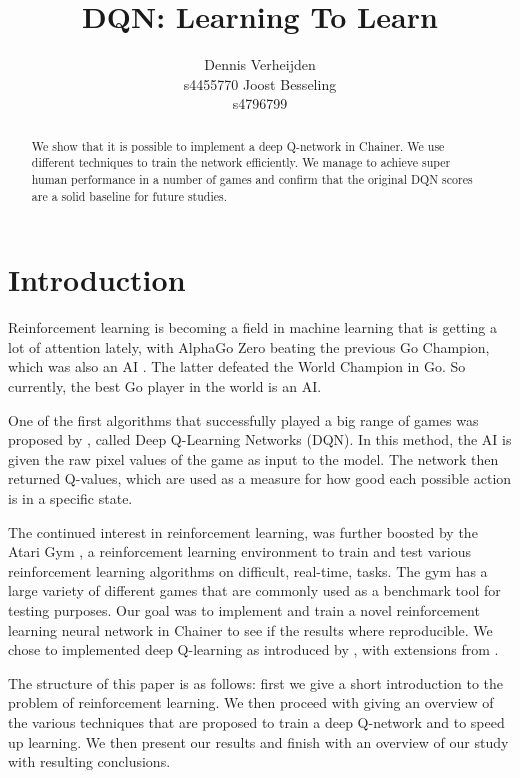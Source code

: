 \documentclass{article}
\title{DQN: Learning To Learn}
\author{
  Dennis Verheijden\\
  s4455770
  \And
  Joost Besseling\\
  s4796799
}
\begin{document}

\maketitle

\begin{abstract}
We show that it is possible to implement a deep Q-network in Chainer. We use different techniques to train the network efficiently. We manage to achieve super human performance in a number of games and confirm that the original DQN scores are a solid baseline for future studies.
\end{abstract}

\section{Introduction}
Reinforcement learning is becoming a field in machine learning that is getting a lot of attention lately, with AlphaGo Zero beating the previous Go Champion, which was also an AI \cite{silver2017mastering}. The latter defeated the World Champion in Go. So currently, the best Go player in the world is an AI.

One of the first algorithms that successfully played a big range of games was proposed by \citep{mnih2013playing}, called Deep Q-Learning Networks (DQN). In this method, the AI is given the raw pixel values of the game as input to the model. The network then returned Q-values, which are used as a measure for how good each possible action is in a specific state. 

The continued interest in reinforcement learning, was further boosted by the Atari Gym \cite{1606.01540}, a reinforcement learning environment to train and test various reinforcement learning algorithms on difficult, real-time, tasks. The gym has a large variety of different games that are commonly used as a benchmark tool for testing purposes. Our goal was to implement and train a novel reinforcement learning neural network in Chainer \cite{chainer_learningsys2015} to see if the results where reproducible. We chose to implemented deep Q-learning as introduced by \cite{mnih2013playing}, with extensions from \cite{mnih2015human}.

The structure of this paper is as follows: first we give a short introduction to the problem of reinforcement learning. We then proceed with giving an overview of the various techniques that are proposed to train a deep Q-network and to speed up learning. We then present our results and finish with an overview of our study with resulting conclusions.
\end{document}
